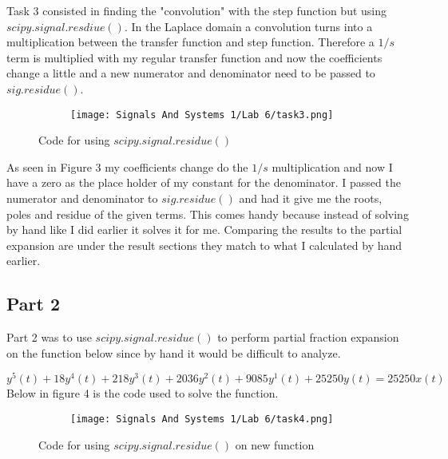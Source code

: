 \documentclass[12pt,a4paper]{article}
\begin{document}
\noindent Task 3 consisted in finding the "convolution" with the step function but using $scipy.signal.resdiue()$. In the Laplace domain a convolution turns into a multiplication between the transfer function and step function. Therefore a $1/s $ term is multiplied with my regular transfer function and now the coefficients change a little and a new numerator and denominator need to be passed to $sig.residue()$. 


\begin{figure}[h]
\begin{subfigure}{ 1\textwidth}
\texttt{[image: Signals And Systems 1/Lab 6/task3.png]}
\end{subfigure}
\caption{Code for using $scipy.signal.residue()$}
\label{fig:image2}
\end{figure}

As seen in Figure 3 my coefficients change do the $1/s$ multiplication and now I have a zero as the place holder of my constant for the denominator.
I passed the numerator and denominator to $sig.residue()$ and had it give me the roots, poles and residue of the given terms. This comes handy because instead of solving by hand like I did earlier it solves it for me. Comparing the results to the partial expansion are under the result sections they match to what I calculated by hand earlier.




\subsection{Part 2}
Part 2 was to use $scipy.signal.residue()$ to perform partial fraction expansion on the function below since by hand it would be
difficult to analyze.

\[y^5(t)+18y^4(t)+218y^3(t)+2036y^2(t)+9085y^1(t)+25250y(t) = 25250x(t)\]
Below in figure 4 is the code used to solve the function.

\clearpage


\begin{figure}[h]
\begin{subfigure}{ 1\textwidth}
\texttt{[image: Signals And Systems 1/Lab 6/task4.png]}
\end{subfigure}
\caption{Code for using $scipy.signal.residue()$ on new function}
\label{fig:image2}
\end{figure}
\end{document}
